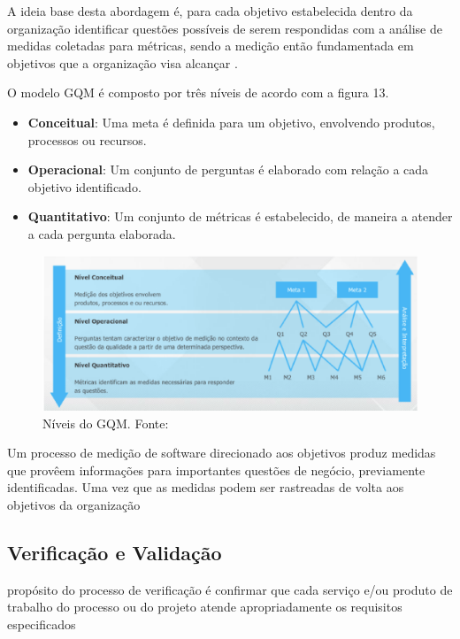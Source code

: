 A ideia base desta abordagem é, para cada objetivo estabelecida dentro da organização identificar questões possíveis de
serem respondidas com a análise de medidas coletadas para métricas, sendo a medição então fundamentada em objetivos que
a organização visa alcançar \cite{junior}.

O modelo GQM é composto por três níveis de acordo com a figura 13.

\begin{itemize}
  \item \textbf{Conceitual}: Uma meta é definida para um objetivo, envolvendo produtos, processos ou recursos.
  \item \textbf{Operacional}: Um conjunto de perguntas é elaborado com relação a cada objetivo identificado.
  \item \textbf{Quantitativo}: Um conjunto de métricas é estabelecido, de maneira a atender a cada pergunta elaborada.
\end{itemize}

\begin{figure}[h!]
	\centering
  \includegraphics[keepaspectratio=true,scale=0.5]{figuras/gqm.eps}
  \caption[Níveis do GQM.]{Níveis do GQM. Fonte: \cite{junior}}
	\label{fig:gqm}
\end{figure}

Um processo de medição de software direcionado aos objetivos produz medidas que provêem informações para importantes questões de negócio, previamente identificadas. Uma vez que as medidas podem ser rastreadas de volta aos objetivos da organização \cite{junior}

\subsection{Verificação e Validação}

propósito do processo de verificação é confirmar que cada serviço e/ou produto de trabalho do processo ou do projeto atende apropriadamente os requisitos especificados \cite{pressman1}


